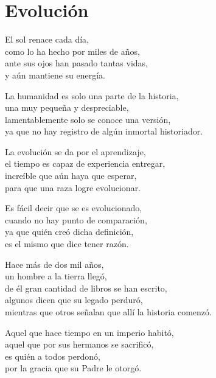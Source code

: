 \section*{Evolución}
\label{Evolucion}

\vspace{1em}
\begin{center}
El sol renace cada día,\\ 
como lo ha hecho por miles de años,\\ 
ante sus ojos han pasado tantas vidas,\\ 
y aún mantiene su energía.

\vspace{1em} 
La humanidad es solo una parte de la historia,\\ 
una muy pequeña y despreciable,\\ 
lamentablemente solo se conoce una versión,\\ 
ya que no hay registro de algún inmortal historiador.

\vspace{1em} 
La evolución se da por el aprendizaje,\\ 
el tiempo es capaz de experiencia entregar,\\ 
increíble que aún haya que esperar,\\ 
para que una raza logre evolucionar.

\vspace{1em} 
Es fácil decir que se es evolucionado,\\ 
cuando no hay punto de comparación,\\ 
ya que quién creó dicha definición,\\ 
es el mismo que dice tener razón.

\vspace{1em} 
Hace más de dos mil años,\\ 
un hombre a la tierra llegó,\\ 
de él gran cantidad de libros se han escrito,\\ 
algunos dicen que su legado perduró,\\ 
mientras que otros señalan que allí la historia comenzó.

\vspace{1em} 
Aquel que hace tiempo en un imperio habitó,\\ 
aquel que por sus hermanos se sacrificó,\\ 
es quién a todos perdonó,\\ 
por la gracia que su Padre le otorgó.


\end{center}
